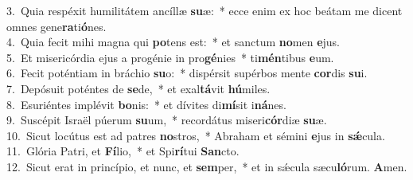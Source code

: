 {3.~}Quia respéxit humilitátem ancíllæ \textbf{su}æ:~* ecce enim ex hoc beátam me dicent omnes gene\textbf{ra}ti\textbf{ó}nes.\\
{4.~}Quia fecit mihi magna qui \textbf{po}tens est:~* et sanctum \textbf{no}men \textbf{e}jus.\\
{5.~}Et misericórdia ejus a progénie in pro\textbf{gé}nies~* ti\textbf{mén}tibus \textbf{e}um.\\
{6.~}Fecit poténtiam in bráchio \textbf{su}o:~* dispérsit supérbos mente \textbf{cor}dis \textbf{su}i.\\
{7.~}Depósuit poténtes de \textbf{se}de,~* et exal\textbf{tá}vit \textbf{hú}miles.\\
{8.~}Esuriéntes implévit \textbf{bo}nis:~* et dívites di\textbf{mí}sit i\textbf{ná}nes.\\
{9.~}Suscépit Israël púerum \textbf{su}um,~* recordátus miseri\textbf{cór}diæ \textbf{su}æ.\\
{10.~}Sicut locútus est ad patres \textbf{no}stros,~* Abraham et sémini \textbf{e}jus in \textbf{sǽ}cula.\\
{11.~}Glória Patri, et \textbf{Fí}lio,~* et Spi\textbf{rí}tui \textbf{San}cto.\\
{12.~}Sicut erat in princípio, et nunc, et \textbf{sem}per,~* et in sǽcula sæcu\textbf{ló}rum. \textbf{A}men.\\
